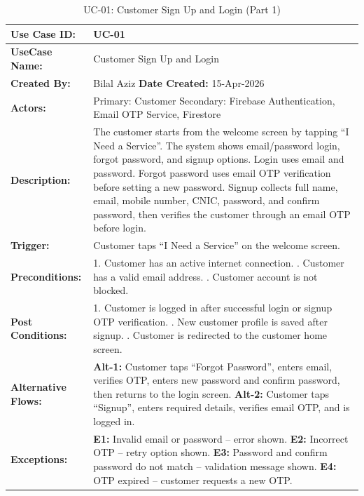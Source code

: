 {\small
\renewcommand{\arraystretch}{1.05}
\begin{table}[H]
\centering
\begin{tabular}{|p{3cm}|p{11.2cm}|}
\hline
\textbf{Use Case ID:} & UC-01 \\ \hline
\textbf{UseCase Name:} & Customer Sign Up and Login \\ \hline
\textbf{Created By:} & Bilal Aziz \hfill \textbf{Date Created:} 15-Apr-2026 \\ \hline
\textbf{Actors:} & Primary: Customer \quad Secondary: Firebase Authentication, Email OTP Service, Firestore \\ \hline
\textbf{Description:} & The customer starts from the welcome screen by tapping ``I Need a Service''. The system shows email/password login, forgot password, and signup options. Login uses email and password. Forgot password uses email OTP verification before setting a new password. Signup collects full name, email, mobile number, CNIC, password, and confirm password, then verifies the customer through an email OTP before login. \\ \hline
\textbf{Trigger:} & Customer taps ``I Need a Service'' on the welcome screen. \\ \hline
\textbf{Preconditions:} & 1. Customer has an active internet connection. \newline 2. Customer has a valid email address. \newline 3. Customer account is not blocked. \\ \hline
\textbf{Post Conditions:} & 1. Customer is logged in after successful login or signup OTP verification. \newline 2. New customer profile is saved after signup. \newline 3. Customer is redirected to the customer home screen. \\ \hline
\textbf{Alternative Flows:} & \textbf{Alt-1:} Customer taps ``Forgot Password'', enters email, verifies OTP, enters new password and confirm password, then returns to the login screen. \newline \textbf{Alt-2:} Customer taps ``Signup'', enters required details, verifies email OTP, and is logged in. \\ \hline
\textbf{Exceptions:} & \textbf{E1:} Invalid email or password -- error shown. \newline \textbf{E2:} Incorrect OTP -- retry option shown. \newline \textbf{E3:} Password and confirm password do not match -- validation message shown. \newline \textbf{E4:} OTP expired -- customer requests a new OTP. \\ \hline
\end{tabular}
\caption*{UC-01: Customer Sign Up and Login (Part 1)}
\end{table}
}

